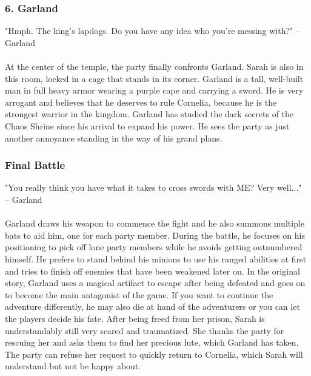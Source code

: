 \subsubsection*{6. Garland}
"Hmph. The king's lapdogs. Do you have any idea who you're messing with?"
\indent -- Garland \\\\ 
At the center of the temple, the party finally confronts Garland.
Sarah is also in this room, locked in a cage that stands in its corner. 
Garland is a tall, well-built man in full heavy armor wearing a purple cape and carrying a sword.
He is very arrogant and believes that he deserves to rule Cornelia, because he is the strongest warrior in the kingdom.
Garland has studied the dark secrets of the Chaos Shrine since his arrival to expand his power.
He sees the party as just another annoyance standing in the way of his grand plans.

\subsubsection*{Final Battle}
"You really think you have what it takes to cross swords with ME? Very well..." \\
\indent -- Garland \\\\ 
Garland draws his weapon to commence the fight and he also summons multiple bats to aid him, one for each party member.
During the battle, he focuses on his positioning to pick off lone party members while he avoids getting outnumbered himself.
He prefers to stand behind his minions to use his ranged abilities at first and tries to finish off enemies that have been weakened later on.  
In the original story, Garland uses a magical artifact to escape after being defeated and goes on to become the main antagonist of the game.
If you want to continue the adventure differently, he may also die at hand of the adventurers or you can let the players decide his fate.
After being freed from her prison, Sarah is understandably still very scared and traumatized.
She thanks the party for rescuing her and asks them to find her precious lute, which Garland has taken.
The party can refuse her request to quickly return to Cornelia, which Sarah will understand but not be happy about.

\vfill

\vfill


\pagebreak

